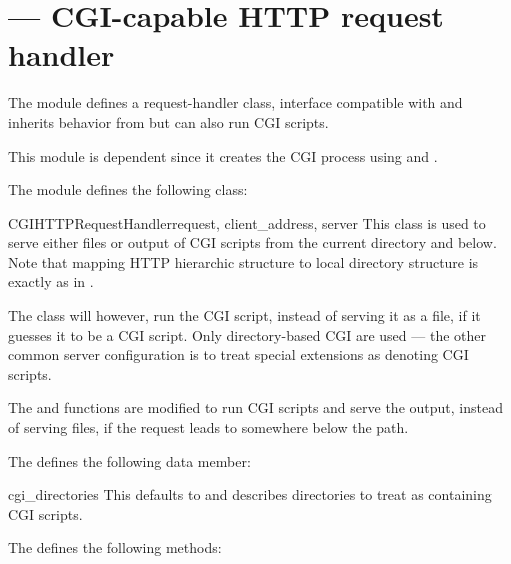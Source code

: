 \section{ ---
         CGI-capable HTTP request handler}




The  module defines a request-handler class,
interface compatible with
 and inherits behavior
from  but can also
run CGI scripts.

  This module is \UNIX{} dependent since it creates the
CGI process using  and .

The  module defines the following class:

\begin{classdesc}{CGIHTTPRequestHandler}{request, client_address, server}
This class is used to serve either files or output of CGI scripts from 
the current directory and below. Note that mapping HTTP hierarchic
structure to local directory structure is exactly as in
.

The class will however, run the CGI script, instead of serving it as a
file, if it guesses it to be a CGI script. Only directory-based CGI
are used --- the other common server configuration is to treat special
extensions as denoting CGI scripts.

The  and  functions are
modified to run CGI scripts and serve the output, instead of serving
files, if the request leads to somewhere below the
 path.
\end{classdesc}

The  defines the following data member:

\begin{memberdesc}{cgi_directories}
This defaults to  and describes
directories to treat as containing CGI scripts.
\end{memberdesc}

The  defines the following methods:

